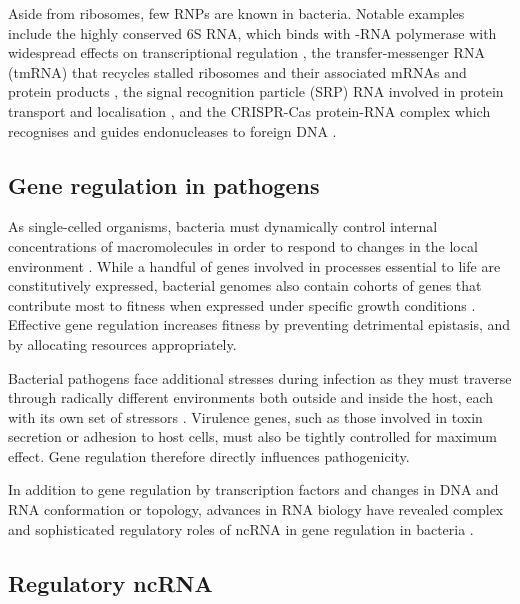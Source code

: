 Aside from ribosomes, few RNPs are known in bacteria. Notable examples include the highly conserved 6S RNA, which binds with -RNA polymerase with widespread effects on transcriptional regulation \citep{Wassarman2007-de}, the transfer-messenger RNA (tmRNA) that recycles stalled ribosomes and their associated mRNAs and protein products \citep{Moore_Sauer_2007}, the signal recognition particle (SRP) RNA involved in protein transport and localisation \citep{Akopian_Shen_Zhang_Shan_2013}, and the CRISPR-Cas protein-RNA complex which recognises and guides endonucleases to foreign DNA \citep{Barrangou2015-sf}.\par

\subsection{Gene regulation in pathogens}

As single-celled organisms, bacteria must dynamically control internal concentrations of macromolecules in order to respond to changes in the local environment \citep{Dorman2018-dv}. While a handful of genes involved in processes essential to life are constitutively expressed, bacterial genomes also contain cohorts of genes that contribute most to fitness when expressed under specific growth conditions \citep{Price2016-gi}. Effective gene regulation increases fitness by preventing detrimental epistasis, and by allocating resources appropriately. \par

Bacterial pathogens face additional stresses during infection as they must traverse through radically different environments both outside and inside the host, each with its own set of stressors \citep{Cotter2000-it}. Virulence genes, such as those involved in toxin secretion or adhesion to host cells, must also be tightly controlled for maximum effect. Gene regulation therefore directly influences pathogenicity. \par
In addition to gene regulation by transcription factors and changes in DNA and RNA conformation or topology, advances in RNA biology have revealed complex and sophisticated regulatory roles of ncRNA in gene regulation in bacteria \citep{Hor2018-ns}.

\subsection{Regulatory ncRNA}

